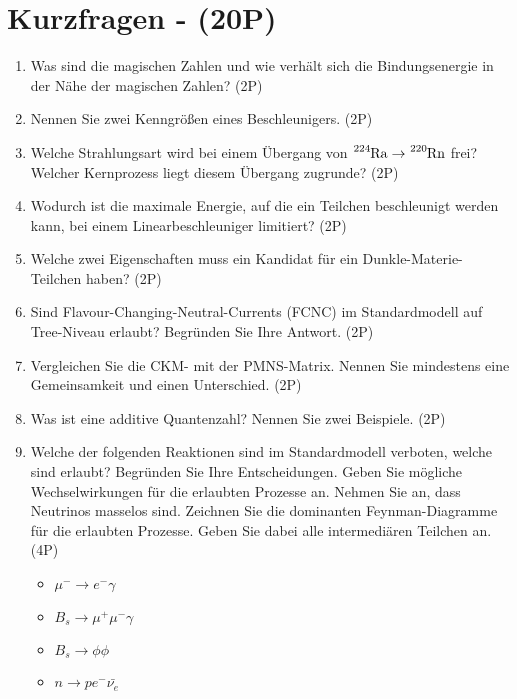 \section{Kurzfragen - (20P)}
\begin{enumerate}
\item Was sind die magischen Zahlen und wie verhält sich die Bindungsenergie in der Nähe der magischen Zahlen? (2P)

\vspace{3cm}\item Nennen Sie zwei Kenngrößen eines Beschleunigers. (2P)

\vspace{3cm}\item Welche Strahlungsart wird bei einem Übergang von $\ce{^{224}Ra} \rightarrow \ce{^{220}Rn}$ frei? Welcher Kernprozess liegt diesem Übergang zugrunde? (2P)

\vspace{3cm}\item Wodurch ist die maximale Energie, auf die ein Teilchen beschleunigt werden kann, bei einem Linearbeschleuniger limitiert? (2P)

\vspace{4cm}\item Welche zwei Eigenschaften muss ein Kandidat für ein Dunkle-Materie-Teilchen haben? (2P)

\vspace{3cm}\item Sind Flavour-Changing-Neutral-Currents (FCNC) im Standardmodell auf Tree-Niveau erlaubt? Begründen Sie Ihre Antwort. (2P)

\vspace{3cm}\item Vergleichen Sie die CKM- mit der PMNS-Matrix. Nennen Sie mindestens eine Gemeinsamkeit und einen Unterschied. (2P)

\vspace{3cm}\item Was ist eine additive Quantenzahl? Nennen Sie zwei Beispiele. (2P)


\vspace{3cm}\item Welche der folgenden Reaktionen sind im Standardmodell verboten, welche sind erlaubt?
Begründen Sie Ihre Entscheidungen. Geben Sie mögliche Wechselwirkungen
für die erlaubten Prozesse an. Nehmen Sie an, dass Neutrinos masselos sind.  
Zeichnen Sie die dominanten Feynman-Diagramme für die erlaubten Prozesse.
Geben Sie dabei alle intermediären Teilchen an. (4P)

\begin{itemize}
    \item $\mu^- \to e^- \gamma $
    \item $B_s \to \mu^+ \mu^- \gamma $
    \item $B_s \to \phi \phi$
    \item $n \to p  e^- \bar{\nu_e}$
\end{itemize}

\end{enumerate}

\null\newpage\clearpage